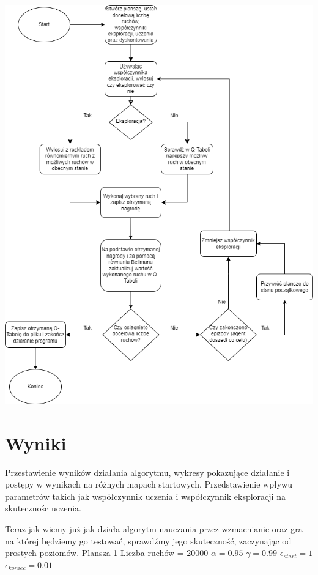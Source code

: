 \documentclass[a4paper,12pt]{article}
\begin{document}
\includegraphics[scale=0.6]{flowchart.png}

\section{Wyniki}

Przestawienie wyników działania algorytmu, wykresy pokazujące działanie i postępy w wynikach na różnych mapach startowych. Przedstawienie wpływu parametrów takich jak współczynnik uczenia i współczynnik eksploracji na skutecznośc uczenia.

Teraz jak wiemy już jak działa algorytm nauczania przez wzmacnianie oraz gra na której będziemy go testować, sprawdźmy jego skuteczność, zaczynając od prostych poziomów.
\newline 
\newline Plansza 1
\newline Liczba ruchów = 20000
\newline \(\alpha = 0.95\)
\newline \(\gamma = 0.99\)
\newline \(\epsilon_{start} = 1\)
\newline \(\epsilon_{koniec} = 0.01\) \newline
\end{document}
